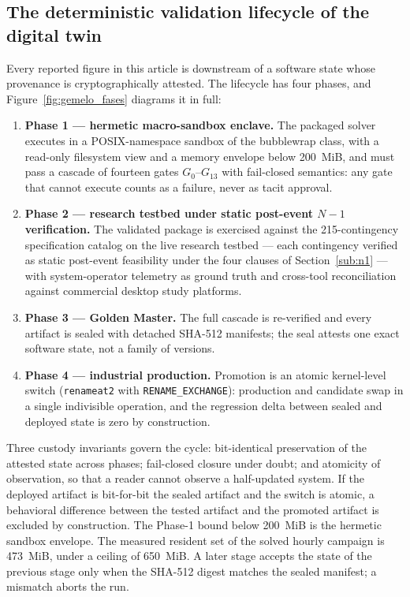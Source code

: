 \subsection{The deterministic validation lifecycle of the digital twin}
\label{sub:lifecycle}

Every reported figure in this article is downstream of a software state whose provenance is cryptographically attested. The lifecycle has four phases, and Figure~\ref{fig:gemelo_fases} diagrams it in full:
\begin{enumerate}
\item \textbf{Phase 1 --- hermetic macro-sandbox enclave.} The packaged solver executes in a POSIX-namespace sandbox of the bubblewrap class, with a read-only filesystem view and a memory envelope below 200~MiB, and must pass a cascade of fourteen gates $G_0$--$G_{13}$ with fail-closed semantics: any gate that cannot execute counts as a failure, never as tacit approval.
\item \textbf{Phase 2 --- research testbed under static post-event $N-1$ verification.} The validated package is exercised against the 215-contingency specification catalog on the live research testbed --- each contingency verified as static post-event feasibility under the four clauses of Section~\ref{sub:n1} --- with system-operator telemetry as ground truth and cross-tool reconciliation against commercial desktop study platforms.
\item \textbf{Phase 3 --- Golden Master.} The full cascade is re-verified and every artifact is sealed with detached SHA-512 manifests; the seal attests one exact software state, not a family of versions.
\item \textbf{Phase 4 --- industrial production.} Promotion is an atomic kernel-level switch (\texttt{renameat2} with \texttt{RENAME\_EXCHANGE}): production and candidate swap in a single indivisible operation, and the regression delta between sealed and deployed state is zero by construction.
\end{enumerate}

Three custody invariants govern the cycle: bit-identical preservation of the attested state across phases; fail-closed closure under doubt; and atomicity of observation, so that a reader cannot observe a half-updated system. If the deployed artifact is bit-for-bit the sealed artifact and the switch is atomic, a behavioral difference between the tested artifact and the promoted artifact is excluded by construction. The Phase-1 bound below 200~MiB is the hermetic sandbox envelope. The measured resident set of the solved hourly campaign is 473~MiB, under a ceiling of 650~MiB. A later stage accepts the state of the previous stage only when the SHA-512 digest matches the sealed manifest; a mismatch aborts the run.

